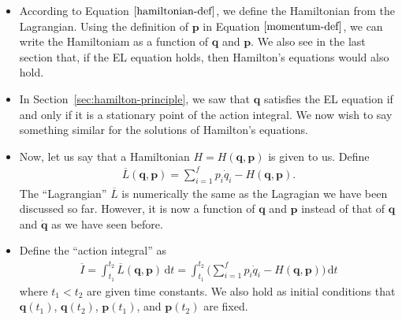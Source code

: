 \documentclass[10pt]{article}
\newcommand{\dee}{\mathrm{d}}
\newcommand{\ve}[1]{\mathbf{#1}}
\begin{document}
  \begin{itemize}
    \item According to Equation $\eqref{hamiltonian-def}$, we define the Hamiltonian from the Lagrangian. Using the definition of $\ve{p}$ in Equation $\eqref{momentum-def}$, we can write the Hamiltoniam as a function of $\ve{q}$ and $\ve{p}$. We also see in the last section that, if the EL equation holds, then Hamilton's equations would also hold.

    \item In Section~\ref{sec:hamilton-principle}, we saw that $\ve{q}$ satisfies the EL equation if and only if it is a stationary point of the action integral. We now wish to say something similar for the solutions of Hamilton's equations.

    \item Now, let us say that a Hamiltonian $H = H(\ve{q},\ve{p})$ is given to us. Define
    \begin{align*}
      \overline{L}(\ve{q},\ve{p}) = \sum_{i=1}^f p_i \dot{q}_i - H(\ve{q},\ve{p}).
    \end{align*}
    The ``Lagrangian'' $\overline{L}$ is numerically the same as the Lagragian we have been discussed so far. However, it is now a function of $\ve{q}$ and $\ve{p}$ instead of that of $\ve{q}$ and $\dot{\ve{q}}$ as we have seen before.

    \item Define the ``action integral'' as
    \begin{align*}
      \overline{I} 
      = \int_{t_1}^{t_2} \overline{L}(\ve{q},\ve{p}) \, \dee t 
      = \int_{t_1}^{t_2} \bigg( \sum_{i=1}^f p_i \dot{q}_i - H(\ve{q},\ve{p}) \bigg)\, \dee t 
    \end{align*}
    where $t_1 < t_2$ are given time constants. We also hold as initial conditions that $\ve{q}(t_1)$, $\ve{q}(t_2)$, $\ve{p}(t_1)$, and $\ve{p}(t_2)$ are fixed.


\end{itemize}
\end{document}
